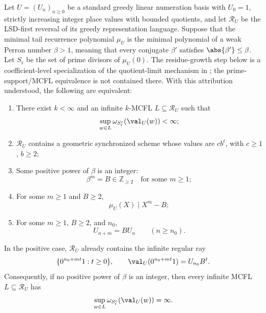 \begin{theorem}
  \label{cor:linear-perron-bounded-support-classification}
  Let \(U=(U_n)_{n\ge0}\) be a standard greedy linear numeration basis with
  \(U_0=1\), strictly increasing integer place values with bounded
  quotients, and let \(\mathcal R_U\) be the LSD-first reversal of its
  greedy representation language. Suppose that the minimal tail recurrence
  polynomial \(\mu_U\) is the minimal polynomial of a weak Perron number
  \(\beta>1\), meaning that every conjugate \(\beta'\) satisfies
  \(\abs{\beta'}\le\beta\). Let \(S_{\mathrm r}\) be the set of prime
  divisors of \(\mu_U(0)\). The residue-growth step below is a
  coefficient-level specialization of the quotient-limit mechanism in
  \cite[Proposition~10 and Remark~12]{CharlierKreczman2025}; the
  prime-support/MCFL equivalence is not contained there. With this
  attribution understood, the following are equivalent:
  \begin{enumerate}[label=\textup{(\roman*)}]
    \item There exist \(k<\infty\) and an infinite \(k\)-MCFL
    \(L\subseteq\mathcal R_U\) such that
    \[
      \sup_{w\in L}\omega_{S_{\mathrm r}^c}(\val_U(w))<\infty;
    \]
    \item \(\mathcal R_U\) contains a geometric synchronized scheme whose
    values are \(cb^t\), with \(c\ge1\), \(b\ge2\);
    \item Some positive power of \(\beta\) is an integer:
    \[
      \beta^m=B\in\mathbb Z_{\ge2}
      \quad\text{for some }m\ge1;
    \]
    \item For some \(m\ge1\) and \(B\ge2\),
    \[
      \mu_U(X)\mid X^m-B;
    \]
    \item For some \(m\ge1\), \(B\ge2\), and \(n_0\),
    \[
      U_{n+m}=BU_n\qquad(n\ge n_0).
    \]
  \end{enumerate}
  In the positive case, \(\mathcal R_U\) already contains the infinite
  regular ray
  \[
    \{0^{n_0+mt}1:t\ge0\},\qquad
    \val_U(0^{n_0+mt}1)=U_{n_0}B^t.
  \]
  Consequently, if no positive power of \(\beta\) is an integer, then every
  infinite MCFL \(L\subseteq\mathcal R_U\) has
  \[
    \sup_{w\in L}\omega_{S_{\mathrm r}^c}(\val_U(w))=\infty.
  \]
\end{theorem}

